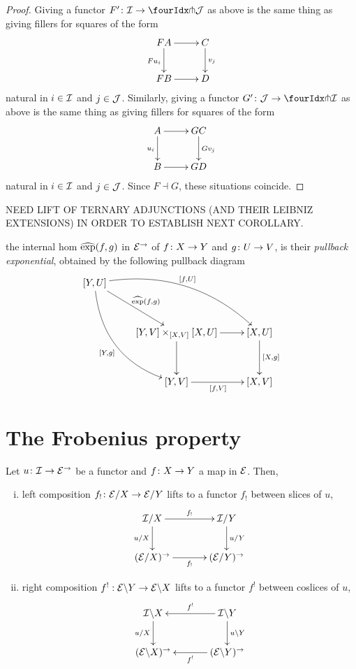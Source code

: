 \documentclass[reqno,10pt,a4paper,oneside]{amsart}
\begin{document}
\begin{proof} Giving a functor $F' \co \cal{I} \to \liftl{\cal{J}}$ as above is the same thing as giving fillers for squares of the form
\[
\xymatrix{
FA \ar[d]_{F u_i} \ar[r] & C \ar[d]^{v_j} \\
FB \ar[r] & D }
\]
natural in $i  \in \cal{I}$ and $j \in \cal{J}$. Similarly, giving a functor $G' \co \cal{J} \to \liftl{\cal{I}}$ as above is the same thing as giving fillers for squares 
of the form
\[
\xymatrix{
A \ar[d]_{u_i} \ar[r] & GC \ar[d]^{Gv_j} \\
B \ar[r] & GD }
\]
 natural in $i \in \cal{I}$ and $j \in \cal{J}$. Since $F \dashv G$, these situations coincide.
\end{proof}



NEED LIFT OF TERNARY ADJUNCTIONS (AND THEIR LEIBNIZ EXTENSIONS) IN ORDER TO ESTABLISH NEXT COROLLARY.

the internal hom $\hatexp(f,g)$ in $\catE^\to$ of $f \co X \to Y$ and $g \co U \to V$, is their \emph{pullback exponential}, obtained by the following pullback diagram
\[
\xymatrix@R=1.2cm{
[Y, U] \ar@/^2pc/[drr]^{[f,U]} \ar@/_2pc/[ddr]_{[Y,g]}  \ar[dr]^{\hatexp(f,g)} & & \\ 
 & [Y,V] \times_{[X,V]} [X,U]  \ar[d] \ar[r] & [X,U] \ar[d]^{[X,g]} \\
 & [Y,V] \ar[r]_{[f,V]} & [X,V] }
 \]








\section{The Frobenius property}
\label{sec:frobenius}

\begin{lemma}
\label{slicing-2-functorial}
Let $u \co \cal{I} \to \catE^{\to}$ be a functor and $f \co X \to Y$ a map in $\catE$. Then, 
\begin{enumerate}[(i)]
\item left composition $f_! \co \calE/X \to \calE/Y$ lifts to a functor $f_!$ between slices of $u$,
\[
\xymatrix@C+1em{
  \cal{I}/X
  \ar[r]^-{f_!}
  \ar[d]_{u/X}
&
  \cal{I}/Y
  \ar[d]^{u/Y}
\\
  (\calE/X)^{\to}
  \ar[r]_-{f_!}
&
  (\calE/Y)^{\to}
}
\]
\item right composition $f^! : \calE \backslash Y \to \calE \backslash X$ lifts to a functor $f^!$ between coslices of $u$,
\[
\xymatrix@C+1em{
  \cal{I} \backslash X
  \ar[d]_{u/X}
&
  \cal{I} \backslash Y
  \ar[l]_-{f^!}
  \ar[d]^{u \backslash Y}
\\
  (\calE \backslash X)^{\to}
&
  (\calE \backslash Y)^{\to}
  \ar[l]^-{f^!}
}
\]
\end{enumerate}
\end{lemma}
\end{document}

